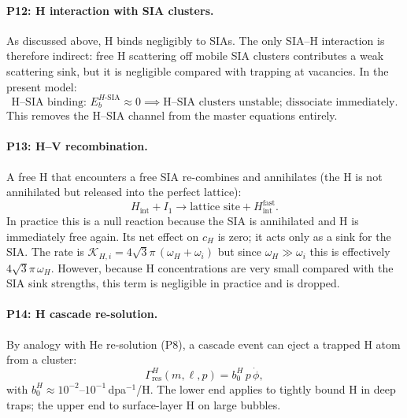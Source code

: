 \documentclass[pdflatex,sn-basic]{sn-jnl} %
\begin{document}
\paragraph{P12: H interaction with SIA clusters.}
As discussed above, H binds negligibly to SIAs.  The only SIA--H
interaction is therefore indirect: free H scattering off mobile SIA
clusters contributes a weak scattering sink, but it is negligible compared
with trapping at vacancies.  In the present model:
\begin{equation}\label{eq:P12}
    \text{H--SIA binding: }E_b^{H\text{-SIA}} \approx 0
    \implies
    \text{H--SIA clusters unstable; dissociate immediately.}
\end{equation}
This removes the H--SIA channel from the master equations entirely.

\paragraph{P13: H--V recombination.}
A free H that encounters a free SIA re-combines and annihilates (the H
is not annihilated but released into the perfect lattice):
\begin{equation}\label{eq:P13}
    H_{\mathrm{int}} + I_1 \to \text{lattice site} + H_{\mathrm{int}}^{\mathrm{fast}}.
\end{equation}
In practice this is a null reaction because the SIA is annihilated and H
is immediately free again.  Its net effect on $c_H$ is zero; it acts only
as a sink for the SIA. The rate is $\mathcal{K}_{H,i} = 4\sqrt{3}\pi\,
(\omega_H + \omega_i)$ but since $\omega_H \gg \omega_i$ this is
effectively $4\sqrt{3}\pi\,\omega_H$.  However, because H concentrations
are very small compared with the SIA sink strengths, this term is
negligible in practice and is dropped.

\paragraph{P14: H cascade re-solution.}
By analogy with He re-solution (P8), a cascade event can eject a trapped
H atom from a cluster:
\begin{equation}\label{eq:P14}
    \Gamma_{\mathrm{res}}^H(m,\ell,p) = b_0^H\,p\,\dot{\phi},
\end{equation}
with $b_0^H \approx 10^{-2}$--$10^{-1}$\,dpa$^{-1}$/H.  The lower end
applies to tightly bound H in deep traps; the upper end to surface-layer
H on large bubbles.

\end{document}

